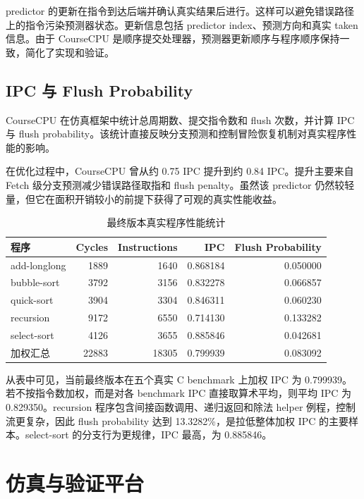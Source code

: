 \documentclass[UTF8,a4paper,12pt]{ctexrep}
\begin{document}
predictor 的更新在指令到达后端并确认真实结果后进行。这样可以避免错误路径上的指令污染预测器状态。更新信息包括 predictor index、预测方向和真实 taken 信息。由于 CourseCPU 是顺序提交处理器，预测器更新顺序与程序顺序保持一致，简化了实现和验证。

\section{IPC 与 Flush Probability}

CourseCPU 在仿真框架中统计总周期数、提交指令数和 flush 次数，并计算 IPC 与 flush probability。该统计直接反映分支预测和控制冒险恢复机制对真实程序性能的影响。

在优化过程中，CourseCPU 曾从约 0.75 IPC 提升到约 0.84 IPC。提升主要来自 Fetch 级分支预测减少错误路径取指和 flush penalty。虽然该 predictor 仍然较轻量，但它在面积开销较小的前提下获得了可观的真实性能收益。

\begin{table}[htbp]
  \centering
  \caption{最终版本真实程序性能统计}
  \begin{tabular}{lrrrr}
    \toprule
    程序 & Cycles & Instructions & IPC & Flush Probability \\
    \midrule
    add-longlong & 1889 & 1640 & 0.868184 & 0.050000 \\
    bubble-sort & 3792 & 3156 & 0.832278 & 0.066857 \\
    quick-sort & 3904 & 3304 & 0.846311 & 0.060230 \\
    recursion & 9172 & 6550 & 0.714130 & 0.133282 \\
    select-sort & 4126 & 3655 & 0.885846 & 0.042681 \\
    \midrule
    加权汇总 & 22883 & 18305 & 0.799939 & 0.083092 \\
    \bottomrule
  \end{tabular}
\end{table}

从表中可见，当前最终版本在五个真实 C benchmark 上加权 IPC 为 0.799939。若不按指令数加权，而是对各 benchmark IPC 直接取算术平均，则平均 IPC 为 0.829350。recursion 程序包含间接函数调用、递归返回和除法 helper 例程，控制流更复杂，因此 flush probability 达到 13.3282\%，是拉低整体加权 IPC 的主要样本。select-sort 的分支行为更规律，IPC 最高，为 0.885846。

\chapter{仿真与验证平台}
\end{document}
